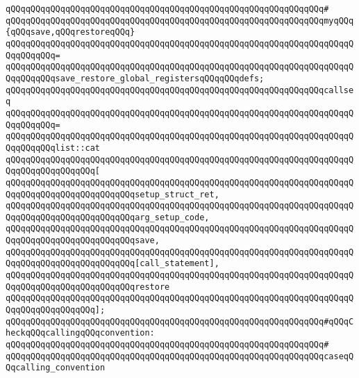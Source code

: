 \verb|qQQqqQQqqQQqqQQqqQQqqQQqqQQqqQQqqQQqqQQqqQQqqQQqqQQqqQQqqQQqqQQq#|\newline
\verb|qQQqqQQqqQQqqQQqqQQqqQQqqQQqqQQqqQQqqQQqqQQqqQQqqQQqqQQqqQQqqQQqmyqQQq{qQQqsave,qQQqrestoreqQQq}|\newline
\verb|qQQqqQQqqQQqqQQqqQQqqQQqqQQqqQQqqQQqqQQqqQQqqQQqqQQqqQQqqQQqqQQqqQQqqQQqqQQqqQQq=|\newline
\verb|qQQqqQQqqQQqqQQqqQQqqQQqqQQqqQQqqQQqqQQqqQQqqQQqqQQqqQQqqQQqqQQqqQQqqQQqqQQqqQQqsave_restore_global_registersqQQqqQQqdefs;|\newline
\newline
\verb|qQQqqQQqqQQqqQQqqQQqqQQqqQQqqQQqqQQqqQQqqQQqqQQqqQQqqQQqqQQqqQQqcallseq|\newline
\verb|qQQqqQQqqQQqqQQqqQQqqQQqqQQqqQQqqQQqqQQqqQQqqQQqqQQqqQQqqQQqqQQqqQQqqQQqqQQqqQQq=|\newline
\verb|qQQqqQQqqQQqqQQqqQQqqQQqqQQqqQQqqQQqqQQqqQQqqQQqqQQqqQQqqQQqqQQqqQQqqQQqqQQqqQQqlist::cat|\newline
\verb|qQQqqQQqqQQqqQQqqQQqqQQqqQQqqQQqqQQqqQQqqQQqqQQqqQQqqQQqqQQqqQQqqQQqqQQqqQQqqQQqqQQqqQQq[|\newline
\verb|qQQqqQQqqQQqqQQqqQQqqQQqqQQqqQQqqQQqqQQqqQQqqQQqqQQqqQQqqQQqqQQqqQQqqQQqqQQqqQQqqQQqqQQqqQQqqQQqsetup_struct_ret,|\newline
\verb|qQQqqQQqqQQqqQQqqQQqqQQqqQQqqQQqqQQqqQQqqQQqqQQqqQQqqQQqqQQqqQQqqQQqqQQqqQQqqQQqqQQqqQQqqQQqqQQqarg_setup_code,|\newline
\verb|qQQqqQQqqQQqqQQqqQQqqQQqqQQqqQQqqQQqqQQqqQQqqQQqqQQqqQQqqQQqqQQqqQQqqQQqqQQqqQQqqQQqqQQqqQQqqQQqsave,|\newline
\verb|qQQqqQQqqQQqqQQqqQQqqQQqqQQqqQQqqQQqqQQqqQQqqQQqqQQqqQQqqQQqqQQqqQQqqQQqqQQqqQQqqQQqqQQqqQQqqQQq[call_statement],|\newline
\verb|qQQqqQQqqQQqqQQqqQQqqQQqqQQqqQQqqQQqqQQqqQQqqQQqqQQqqQQqqQQqqQQqqQQqqQQqqQQqqQQqqQQqqQQqqQQqqQQqrestore|\newline
\verb|qQQqqQQqqQQqqQQqqQQqqQQqqQQqqQQqqQQqqQQqqQQqqQQqqQQqqQQqqQQqqQQqqQQqqQQqqQQqqQQqqQQqqQQq];|\newline
\newline
\verb|qQQqqQQqqQQqqQQqqQQqqQQqqQQqqQQqqQQqqQQqqQQqqQQqqQQqqQQqqQQqqQQq#qQQqCheckqQQqcallingqQQqconvention:|\newline
\verb|qQQqqQQqqQQqqQQqqQQqqQQqqQQqqQQqqQQqqQQqqQQqqQQqqQQqqQQqqQQqqQQq#|\newline
\verb|qQQqqQQqqQQqqQQqqQQqqQQqqQQqqQQqqQQqqQQqqQQqqQQqqQQqqQQqqQQqqQQqcaseqQQqcalling_convention|\newline
